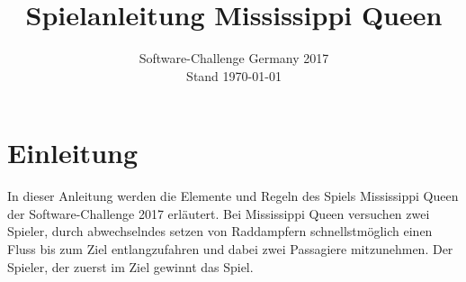 \documentclass[12pt,a4paper, ngerman, oneside]{scrartcl}
\date{Software-Challenge Germany 2017\\Stand \today}
\title{Spielanleitung Mississippi Queen}
\newcommand\blfootnote[1]{%
  \begingroup
  \renewcommand\thefootnote{}\footnote{#1}%
  \addtocounter{footnote}{-1}%
  \endgroup
}
\begin{document}
\maketitle
\vspace*{\fill}


\newpage
\tableofcontents
\thispagestyle{empty}
\newpage
\setcounter{page}{1}
\section{Einleitung}
In dieser Anleitung werden die Elemente und Regeln des Spiels Mississippi Queen der
Software-Challenge 2017 erläutert.
Bei Mississippi Queen versuchen zwei Spieler, durch abwechselndes setzen von Raddampfern 
schnellstmöglich einen Fluss bis zum Ziel entlangzufahren und dabei zwei Passagiere mitzunehmen.
Der Spieler, der zuerst im Ziel gewinnt das Spiel.
\end{document}

